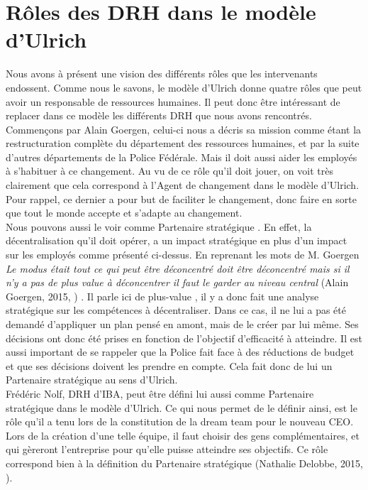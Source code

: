 \section{Rôles des DRH dans le modèle d'Ulrich}

Nous avons à présent une vision des différents rôles que les intervenants endossent. Comme nous le savons, le modèle d'Ulrich donne quatre rôles que peut avoir un responsable de ressources humaines. Il peut donc être intéressant de replacer dans ce modèle les différents DRH que nous avons rencontrés. \\

Commençons par Alain Goergen, celui-ci nous a décris sa mission comme étant la restructuration complète du département des ressources humaines, et par la suite d'autres départements de la Police Fédérale. Mais il doit aussi aider les employés à s'habituer à ce changement. Au vu de ce rôle qu'il doit jouer, on voit très clairement que cela correspond à l'\og Agent de changement \fg{} dans le modèle d'Ulrich. Pour rappel, ce dernier a pour but de faciliter le changement, donc faire en sorte que tout le monde accepte et s'adapte au changement.\\

Nous pouvons aussi le voir comme \og Partenaire stratégique \fg{}. En effet, la décentralisation qu'il doit opérer, a un impact stratégique en plus d'un impact sur les employés comme présenté ci-dessus. En reprenant les mots de M. Goergen \textit{\og Le modus était tout ce qui peut être déconcentré doit être déconcentré mais si il n'y a pas de plus value à déconcentrer il faut le garder au niveau central \fg{}} (Alain Goergen, 2015, \cite{tableronde}) . Il parle ici de \og plus-value \fg{}, il y a donc fait une analyse stratégique sur les compétences à décentraliser. Dans ce cas, il ne lui a pas été demandé d'appliquer un plan pensé en amont, mais de le créer par lui même. Ses décisions ont donc été prises en fonction de l'objectif d'efficacité à atteindre. Il est aussi important de se rappeler que la Police fait face à des réductions de budget et que ses décisions doivent les prendre en compte. Cela fait donc de lui un \og Partenaire stratégique \fg{} au sens d'Ulrich.\\   

Frédéric Nolf, DRH d'IBA, peut être défini lui aussi comme \og{}Partenaire stratégique\fg{} dans le modèle d'Ulrich. Ce qui nous permet de le définir ainsi, est le rôle qu'il a tenu lors de la constitution de la \og dream team\fg{} pour le nouveau CEO. Lors de la création d'une telle équipe, il faut choisir des gens complémentaires, et qui gèreront l'entreprise pour qu'elle puisse atteindre ses objectifs. Ce rôle correspond bien à la définition du \og Partenaire stratégique \fg{} (Nathalie Delobbe, 2015, \cite{slidegrh}).\newline

